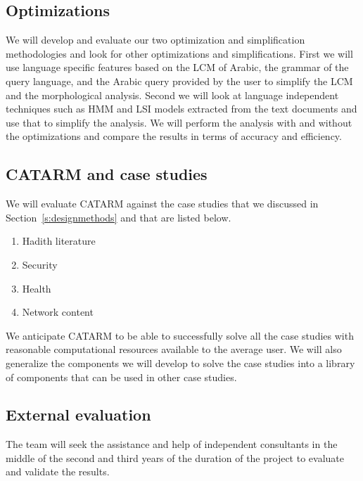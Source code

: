 \documentclass[12pt]{article}
\begin{document}
\subsection{Optimizations}

We will develop and evaluate our two optimization 
and simplification methodologies
and look for other optimizations and simplifications. 
First we will use language specific features based on the 
LCM of Arabic, the grammar of the query language, and 
the Arabic query provided by the user to simplify 
the LCM and the morphological analysis. 
Second we will look at language independent techniques
such as HMM and LSI models extracted from the 
text documents and use that to simplify the analysis. 
We will perform the analysis with and without the optimizations
and compare the results in terms of accuracy and efficiency. 

\subsection{CATARM and case studies }

We will evaluate CATARM against the case studies
that we discussed in Section~\ref{s:designmethods}
and that are listed below. 
\begin{enumerate}
\item Hadith literature
\item Security
\item Health
\item Network content
\end{enumerate}

We anticipate CATARM to be able to successfully solve all the case
studies with reasonable computational resources available to the 
average user. 
We will also generalize the components we will develop to solve
the case studies into a library of components that can be used
in other case studies. 

\subsection{External evaluation }

The team will seek the assistance and help of independent 
consultants  in the middle of the second and third years of 
the duration of the project to evaluate and validate the results.
\end{document}
